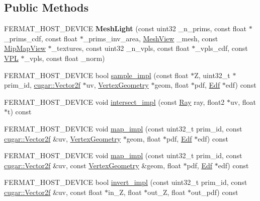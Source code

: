 \subsection*{Public Methods}
\begin{DoxyCompactItemize}
\item 
\mbox{\label{struct_mesh_light_a222612bad947072eea2d1f0936ef2828}} 
F\+E\+R\+M\+A\+T\+\_\+\+H\+O\+S\+T\+\_\+\+D\+E\+V\+I\+CE {\bfseries Mesh\+Light} (const uint32 \+\_\+n\+\_\+prims, const float $\ast$\+\_\+prims\+\_\+cdf, const float $\ast$\+\_\+prims\+\_\+inv\+\_\+area, \hyperlink{struct_mesh_view}{Mesh\+View} \+\_\+mesh, const \hyperlink{struct_mip_map_view}{Mip\+Map\+View} $\ast$\+\_\+textures, const uint32 \+\_\+n\+\_\+vpls, const float $\ast$\+\_\+vpls\+\_\+cdf, const \hyperlink{struct_v_p_l}{V\+PL} $\ast$\+\_\+vpls, const float \+\_\+norm)
\item 
F\+E\+R\+M\+A\+T\+\_\+\+H\+O\+S\+T\+\_\+\+D\+E\+V\+I\+CE bool \hyperlink{struct_mesh_light_a41958f4c2147ad55bb95ca8ba90ec39b}{sample\+\_\+impl} (const float $\ast$Z, uint32\+\_\+t $\ast$prim\+\_\+id, \hyperlink{structcugar_1_1_vector}{cugar\+::\+Vector2f} $\ast$uv, \hyperlink{struct_vertex_geometry}{Vertex\+Geometry} $\ast$geom, float $\ast$pdf, \hyperlink{struct_edf}{Edf} $\ast$edf) const
\item 
F\+E\+R\+M\+A\+T\+\_\+\+H\+O\+S\+T\+\_\+\+D\+E\+V\+I\+CE void \hyperlink{struct_mesh_light_a86f0d4badaca1671063ce758bd04812f}{intersect\+\_\+impl} (const \hyperlink{struct_ray}{Ray} ray, float2 $\ast$uv, float $\ast$t) const
\item 
F\+E\+R\+M\+A\+T\+\_\+\+H\+O\+S\+T\+\_\+\+D\+E\+V\+I\+CE void \hyperlink{struct_mesh_light_ad39eed77c5604446aef6dc7373ba80ce}{map\+\_\+impl} (const uint32\+\_\+t prim\+\_\+id, const \hyperlink{structcugar_1_1_vector}{cugar\+::\+Vector2f} \&uv, \hyperlink{struct_vertex_geometry}{Vertex\+Geometry} $\ast$geom, float $\ast$pdf, \hyperlink{struct_edf}{Edf} $\ast$edf) const
\item 
F\+E\+R\+M\+A\+T\+\_\+\+H\+O\+S\+T\+\_\+\+D\+E\+V\+I\+CE void \hyperlink{struct_mesh_light_a0be71bfb03b0489b514a3efcb2daf2a8}{map\+\_\+impl} (const uint32\+\_\+t prim\+\_\+id, const \hyperlink{structcugar_1_1_vector}{cugar\+::\+Vector2f} \&uv, const \hyperlink{struct_vertex_geometry}{Vertex\+Geometry} \&geom, float $\ast$pdf, \hyperlink{struct_edf}{Edf} $\ast$edf) const
\item 
F\+E\+R\+M\+A\+T\+\_\+\+H\+O\+S\+T\+\_\+\+D\+E\+V\+I\+CE bool \hyperlink{struct_mesh_light_a60e26a42c876094525bf87497084c798}{invert\+\_\+impl} (const uint32\+\_\+t prim\+\_\+id, const \hyperlink{structcugar_1_1_vector}{cugar\+::\+Vector2f} \&uv, const float $\ast$in\+\_\+Z, float $\ast$out\+\_\+Z, float $\ast$out\+\_\+pdf) const

\end{DoxyCompactItemize}
